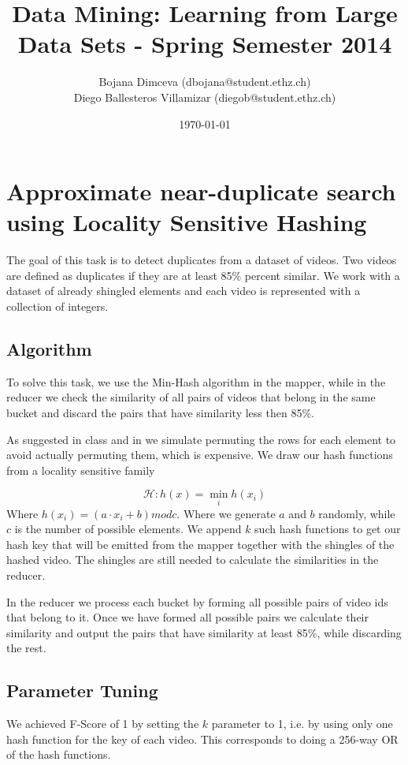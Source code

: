 \documentclass[a4paper, 11pt]{article}
\title{Data Mining: Learning from Large Data Sets - Spring Semester 2014}
\author{Bojana Dimceva (dbojana@student.ethz.ch)\\
	    Diego Ballesteros Villamizar (diegob@student.ethz.ch)\\}
\date{\today}
\begin{document}
\maketitle

\section{Approximate near-duplicate search using Locality Sensitive Hashing} 
The goal of this task is to detect duplicates from a dataset of videos. Two videos are defined as duplicates if they are at least 85\% percent similar. We work with a dataset of already shingled elements and each video is represented with a collection of integers. 

\subsection{Algorithm}
To solve this task, we use the Min-Hash algorithm in the mapper, while in the reducer we check the similarity of all pairs of videos that belong in the same bucket and discard the pairs that have similarity less then 85\%.
 
As suggested in class and in \cite{ullman} we simulate permuting the rows for each element to avoid actually permuting them, which is expensive. We draw our hash functions from a locality sensitive family

$$\mathcal{H} : h(x)= \min\limits_{i} h(x_i)$$
Where $h(x_i)=(a \cdot x_i+b) mod c$. Where we generate $a$ and $b$ randomly, while $c$ is the number of possible elements. We append $k$ such hash functions to get our hash key that will be emitted from the mapper together with the shingles of the hashed video. The shingles are still needed to calculate the similarities in the reducer.

In the reducer we process each bucket by forming all possible pairs of video ids that belong to it. Once we have formed all possible pairs we calculate their similarity and output the pairs that have similarity at least 85\%, while discarding the rest.

\subsection{Parameter Tuning}

We achieved F-Score of 1 by setting the $k$ parameter to 1, i.e. by using only one hash function for the key of each video. This corresponds to doing a 256-way OR of the hash functions.
\end{document}

